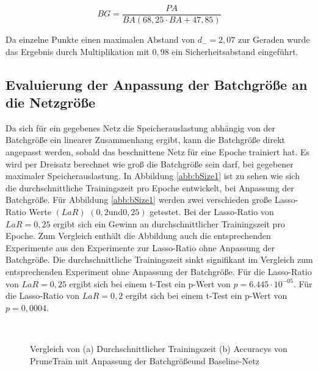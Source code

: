 \begin{equation}
 BG=\frac{PA}{BA\left( 68,25 \cdot BA + 47,85\right)}
\end{equation}


Da einzelne Punkte einen maximalen Abstand von $d_{-}=2,07$ zur Geraden wurde das Ergebnis durch Multiplikation mit $0,98$ ein Sicherheitsabstand eingeführt.


\subsection{Evaluierung der Anpassung der Batchgröße an die Netzgröße}

Da sich für ein gegebenes Netz die Speicherauslastung abhängig von der Batchgröße ein linearer Zusammenhang ergibt, kann die Batchgröße direkt angepasst werden, sobald das beschnittene Netz für eine Epoche trainiert hat. Es wird per Dreisatz berechnet wie groß die Batchgröße sein darf, bei gegebener maximaler Speicherauslastung. In Abbildung \ref{abb:bSize1} ist zu sehen wie sich die durchschnittliche Trainingszeit pro Epoche entwickelt, bei Anpassung der Batchgröße. Für Abbildung \ref{abb:bSize1} werden zwei verschieden große Lasso-Ratio Werte $(LaR)$ $(0,2 \text{und} 0,25)$ getestet. Bei der Lasso-Ratio von $LaR=0,25$ ergibt sich ein Gewinn an durchschnittlicher Trainingszeit pro Epoche. Zum Vergleich enthält die Abbildung auch die entsprechenden Experimente aus den Experimente zur Lasso-Ratio ohne Anpassung der Batchgröße. Die durchschnittliche Trainingszeit sinkt signifikant im Vergleich zum entsprechenden Experiment ohne Anpassung der Batchgröße. Für die Lasso-Ratio von $LaR=0,25$ ergibt sich bei einem t-Test ein p-Wert von $p=6.445\cdot 10^{-05}$. Für die Lasso-Ratio von $LaR=0,2$ ergibt sich bei einem t-Test ein p-Wert von $p=0,0004$. 



 \begin{figure}
     \centering
     \hfill
     \\
     \caption{Vergleich von (a) Durchschnittlicher Trainingszeit (b) Accuracys von PruneTrain mit Anpassung der Batchgrößeund Baseline-Netz}
     \label{abb:bSize}
\end{figure}

